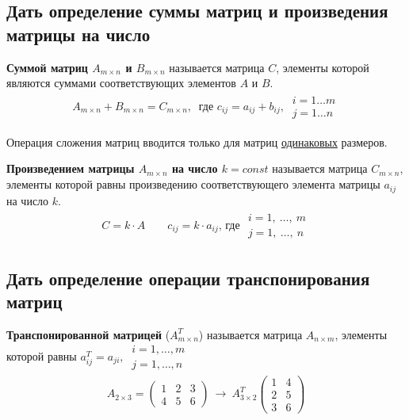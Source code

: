 \newpage
\subsection{Дать определение суммы матриц и произведения матрицы на число}
\begin{definition*}
	\textbf{Суммой матриц $A_{m\times n}$ и $B_{m\times n}$} называется матрица $C$, элементы которой являются суммами соответствующих элементов $A$ и $B$.
	\begin{gather*}
		A_{m\times n} + B_{m\times n} = C_{m\times n},\ \text{ где } c_{ij} = a_{ij} + b_{ij},\ \begin{array}{l} i=1\ldots m \\ j=1\ldots n \end{array}
	\end{gather*}
\end{definition*}
\begin{remark}
	Операция сложения матриц вводится только для матриц \underline{одинаковых} размеров.
\end{remark}
\begin{definition*}
	\textbf{Произведением матрицы $A_{m\times n}$ на число $k = const$} называется матрица $C_{m\times n}$, элементы которой равны произведению соответствующего элемента матрицы $a_{ij}$ на число $k$.
	\begin{gather*}
		C = k\cdot A \qquad c_{ij} = k\cdot a_{ij} \text{, где } \begin{array}{l} i=1,\ \ldots ,\ m \\ j=1,\ \ldots ,\ n \end{array}
	\end{gather*}
\end{definition*}

\subsection{Дать определение операции транспонирования матриц}
\begin{definition*}
	\textbf{Транспонированной матрицей} ($A^T_{m\times n}$) называется матрица $A_{n\times m}$, элементы которой равны $a^T_{ij} = a_{ji},\ \begin{array}{l} i = 1, \ldots , m \\ j = 1, \ldots , n \end{array} $
	\begin{gather*}
		A_{2\times 3} = \begin{pmatrix}
			1 & 2 & 3 \\
			4 & 5 & 6
		\end{pmatrix}\ \longrightarrow\
		A^T_{3\times 2} \begin{pmatrix}
			1 & 4 \\
			2 & 5 \\
			3 & 6
		\end{pmatrix}
	\end{gather*}
\end{definition*}

